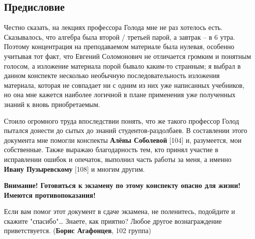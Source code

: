\subsection*{Предисловие}
 
 Честно сказать, на лекциях профессора Голода мне не раз хотелось
 есть. Сказывалось, что алгебра была второй / третьей парой, а
 завтрак -- в 6 утра. Поэтому концентрация на преподаваемом материале
 была нулевая, особенно учитывая тот факт, что Евгений Соломонович не
 отличается громким и понятным голосом, а изложение материала порой
 бывало каким-то странным; я выбрал в данном конспекте несколько
 необычную последовательность изложения материала, которая не
 совпадает ни с одним из них уже написанных учебников, но она мне
 кажется наиболее логичной в плане применения уже полученных знаний к
 вновь приобретаемым.
 
 Стоило огромного труда впоследствии понять, что же такого профессор
 Голод пытался донести до сытых до знаний студентов-раздолбаев. В
 составлении этого документа мне помогли конспекты {\bfseries Алёны
 Соболевой} [104] и, разумеется, мои собственные. Также выражаю
 благодарность тем, кто принял участие в исправлении ошибок и
 опечаток, выполнил часть работы за меня, а именно {\bfseries Ивану
 Пузыревскому} [108] и многим другим.



\begin{petit}

{\color{red}\bf Внимание! Готовиться к экзамену по этому конспекту опасно
  для жизни! Имеются противопоказания!}

\end{petit} 

\begin{petit}
Если вам помог этот документ в сдаче экзамена, не поленитесь, подойдите и скажите "спасибо"\ldots
Знаете, как приятно? Любое другое вознаграждение приветствуется.
({\bfseries Борис Агафонцев}, 102 группа)
\end{petit}
 
 
